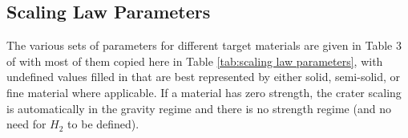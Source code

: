 \documentclass{article}
\begin{document}
\subsection{Scaling Law Parameters}\label{ssec:Scaling Law Parameters}

The various sets of parameters for different target materials are given in Table 3 of \cite{housen2011ejecta} with most of them copied here in Table \ref{tab:scaling law parameters}, with undefined values filled in that are best represented by either solid, semi-solid, or fine material where applicable. If a material has zero strength, the crater scaling is automatically in the gravity regime and there is no strength regime (and no need for $H_2$ to be defined).
\end{document}
